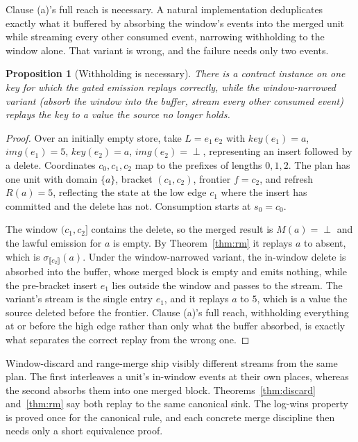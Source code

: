 \documentclass[sigconf,nonacm,10pt]{acmart}
\theoremstyle{plain}
\newtheorem{proposition}{Proposition}
\theoremstyle{definition}
\newcommand{\den}[1]{\llbracket #1 \rrbracket}   %
\newcommand{\window}[2]{(#1,#2]}                 %
\newcommand{\keyof}{\mathit{key}}                %
\newcommand{\imgof}{\mathit{img}}                %
\begin{document}
Clause (a)'s full reach is necessary. A natural implementation
deduplicates exactly what it buffered by absorbing the window's
events into the merged unit while streaming every other consumed
event, narrowing withholding to the window alone. That variant
is wrong, and the failure needs only two events.

\begin{proposition}[Withholding is necessary]\label{prop:withhold}
There is a contract instance on one key for which the gated
emission replays correctly, while the window-narrowed variant
(absorb the window into the buffer, stream every other consumed
event) replays the key to a value the source no longer holds.
\end{proposition}

\begin{proof}
Over an initially empty store, take
$L = e_1\, e_2$ with $\keyof(e_1) = a$, $\imgof(e_1) = 5$,
$\keyof(e_2) = a$, $\imgof(e_2) = \perp$, representing an insert followed by a
delete. Coordinates $c_0, c_1, c_2$ map to the prefixes of lengths
$0, 1, 2$. The plan has one unit with domain $\{a\}$, bracket $(c_1, c_2)$,
frontier $f = c_2$, and refresh $R(a) = 5$, reflecting the state at the low edge
$c_1$ where the insert has committed and the delete has not.
Consumption starts at $s_0 = c_0$.

The window $\window{c_1}{c_2}$ contains the delete, so the merged
result is $M(a) = \perp$ and the lawful emission for $a$ is
empty. By Theorem~\ref{thm:rm} it replays $a$ to absent, which is
$\sigma_{\den{c_2}}(a)$. Under the window-narrowed variant, the
in-window delete is absorbed into the buffer, whose merged block
is empty and emits nothing, while the pre-bracket insert $e_1$
lies outside the window and passes to the stream. The variant's
stream is the single entry $e_1$, and it
replays $a$ to $5$, which is a value the source deleted before the
frontier. Clause (a)'s full reach, withholding everything at or before the high edge rather than only what the buffer absorbed, is exactly what separates the correct replay from the wrong one.
\end{proof}

Window-discard and range-merge ship visibly different streams
from the same plan. The first interleaves a unit's in-window
events at their own places, whereas the second absorbs them into
one merged block. Theorems~\ref{thm:discard} and~\ref{thm:rm} say
both replay to the same canonical sink. The log-wins property is proved once for the canonical rule, and each concrete merge discipline then needs only a short equivalence proof.
\end{document}
